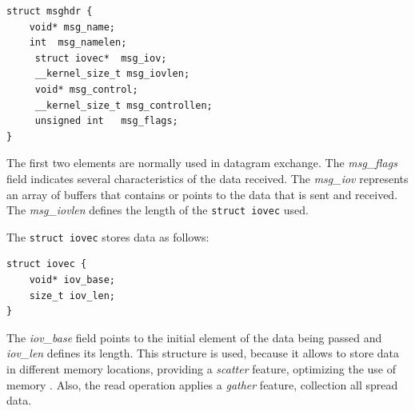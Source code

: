 \begin{lstlisting}[caption=Declaration of the \texttt{msghdr} structure]
struct msghdr {
    void* msg_name;
    int	 msg_namelen;
     struct iovec*	msg_iov;
     __kernel_size_t msg_iovlen;
     void* msg_control;
     __kernel_size_t msg_controllen;
     unsigned int	msg_flags;
}
\end{lstlisting}

The first two elements are normally used in datagram exchange. The \textit{msg\_flags} field indicates several characteristics of the data received. The \textit{msg\_iov} represents an array of buffers that contains or points to the data that is sent and received. The \textit{msg\_iovlen} defines the length of the \texttt{struct iovec} used.

The \texttt{struct iovec} stores data as follows:

\begin{lstlisting}[caption=Declaration of the \texttt{iovec} structure]
struct iovec {
    void* iov_base;
    size_t iov_len;
}
\end{lstlisting}

The \textit{iov\_base} field points to the initial element of the data being passed and \textit{iov\_len} defines its length. This structure is used, because it allows to store data in different memory locations, providing a \textit{scatter} feature, optimizing the use of memory \cite{Stevens:APUE}. Also, the read operation applies a \textit{gather} feature, collection all spread data.





